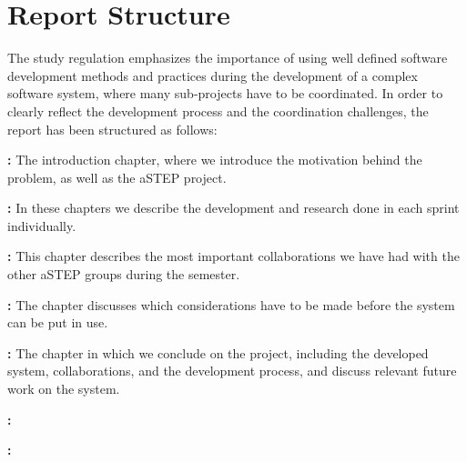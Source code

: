 \section{Report Structure} \label{sec:report_structure}
The study regulation emphasizes the importance of using well defined software development methods and practices during the development of a complex software system, where many sub-projects have to be coordinated. In order to clearly reflect the development process and the coordination challenges, the report has been structured as follows:

\textbf{:} The introduction chapter, where we introduce the motivation behind the problem, as well as the aSTEP project.

\textbf{:} In these chapters we describe the development and research done in each sprint individually.

\textbf{:} This chapter describes the most important collaborations we have had with the other aSTEP groups during the semester.

\textbf{:} The chapter discusses which considerations have to be made before the system can be put in use.

\textbf{:} The chapter in which we conclude on the project, including the developed system, collaborations, and the development process, and discuss relevant future work on the system.

\textbf{:}

\textbf{:}